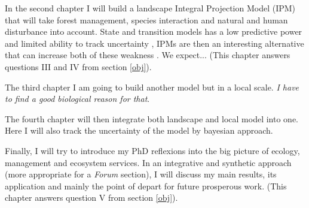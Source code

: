 In the second chapter I will build a landscape Integral Projection Model (IPM) that will take forest management, species interaction and natural and human disturbance into account.
State and transition models has a low predictive power and limited ability to track uncertainty \parencite{Bashari, Smith and Bosch, 2008; Phillips, 2011}, IPMs are then an interesting alternative that can increase both of these weakness \parencite{}.
We expect... (This chapter answers questions III and IV from section \ref{obj}).

The third chapter I am going to build another model but in a local scale. \textit{I have to find a good biological reason for that}.

The fourth chapter will then integrate both landscape and local model into one. Here I will also track the uncertainty of the model by bayesian approach.

Finally, I will try to introduce my PhD reflexions into the big picture of ecology, management and ecosystem services. In an integrative and synthetic approach (more appropriate for a \textit{Forum} section), I will discuss my main results, its application and mainly the point of depart for future prosperous work. (This chapter answers question V from section \ref{obj}).


\clearpage
\printbibliography


